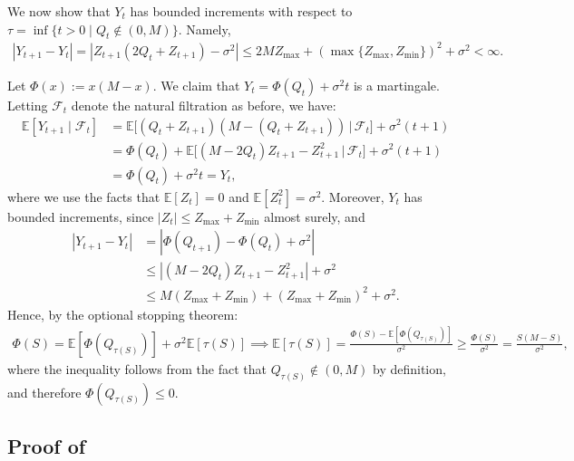 \documentclass[mnsc,nonblindrev]{informs3}
\newcommand{\F}{\mathcal{F}}
\newcommand{\E}{\mathbb{E}}
\newcommand{\Exp}[1]{\mathbb{E} \left[ #1 \right]} %
\renewenvironment{proof}[1][Proof]{%
  \par\noindent{\itshape #1.} \ignorespaces
}{%
  \hfill\Halmos\par
}
\begin{document}
\begin{APPENDICES}
\begin{proof}
    We now show that $Y_t$ has bounded increments with respect to $\tau = \inf\{t > 0 \mid Q_t \not\in (0,M)\}$. Namely,
    \begin{align*}
        |Y_{t+1}-Y_{t}| = |Z_{t+1}\left(2Q_t+Z_{t+1}\right)-\sigma^2| \leq 2MZ_{\max} + \left(\max\{Z_{\max},Z_{\min}\}\right)^2 + \sigma^2 < \infty.
    \end{align*}
\end{proof}


\OneStepStopping*
\begin{proof}
Let $\Phi(x):=x(M-x)$. We claim that $Y_t = \Phi(Q_t) + \sigma^2 t$ is a martingale. Letting $\mathcal{F}_t$ denote the natural filtration as before, we have:
\begin{align*}
\E[Y_{t+1} \mid \F_t]
&=\E\big[ (Q_{t}+Z_{t+1})(M-(Q_{t}+Z_{t+1})) \,\big|\, \F_t \big] + \sigma^2(t+1) \\
&=\Phi(Q_t) + \E\big[(M-2Q_t)Z_{t+1} - Z_{t+1}^2 \,\big|\, \F_t\big] + \sigma^2(t+1) \\
&=\Phi(Q_t) + \sigma^2t = Y_t,
\end{align*}
where we use the facts that $\Exp{Z_t} = 0$ and $\Exp{Z_t^2} = \sigma^2$. Moreover, $Y_t$ has bounded increments, since $|Z_t| \leq Z_{\max} + Z_{\min}$ almost surely, and
\begin{align*}
    |Y_{t+1} - Y_t| & = |\Phi(Q_{t+1}) - \Phi(Q_t) + \sigma^2| \\
    & \leq |(M-2Q_t)Z_{t+1} - Z_{t+1}^2| + \sigma^2 \\
    & \leq M(Z_{\max} + Z_{\min}) + (Z_{\max} + Z_{\min})^2 + \sigma^2.
\end{align*}
Hence, by the optional stopping theorem:
\begin{align*}
    \Phi(S) = \Exp{\Phi(Q_{\tau(S)})} + \sigma^2 \E[\tau(S)] \implies \E[\tau(S)] = \frac{\Phi(S)-\Exp{\Phi(Q_{\tau(S)})}}{\sigma^2} \geq \frac{\Phi(S)}{\sigma^2} = \frac{S(M-S)}{\sigma^2},
\end{align*}
where the inequality follows from the fact that $Q_{\tau(S)} \not\in (0,M)$ by definition, and therefore $\Phi(Q_{\tau(S)}) \leq 0$.
\end{proof}



\subsection{Proof of }\label{apx:thm-3-proof}




\end{APPENDICES}
\end{document}
